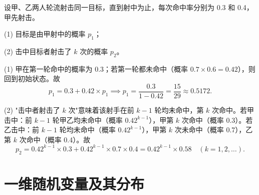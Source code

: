 \documentclass[lang=cn,11pt]{elegantbook}
\begin{document}
\begin{exercise}\label{exer:1-59}
设甲、乙两人轮流射击同一目标，直到射中为止，每次命中率分别为 0.3 和 0.4，甲先射击。\par
(1) 目标是由甲射中的概率 \(p_1\)；\par
(2) 击中目标者射击了 \(k\) 次的概率 \(p_2\)。
\end{exercise}

\begin{solution}
(1) 甲在第一轮命中的概率为 0.3；若第一轮都未命中（概率 \(0.7\times 0.6=0.42\)），则回到初始状态。故
\[
p_1 = 0.3 + 0.42\times p_1 \implies p_1 = \frac{0.3}{1-0.42} = \frac{15}{29} \approx 0.5172.
\]

(2) "击中者射击了 \(k\) 次"意味着该射手在前 \(k-1\) 轮均未命中，第 \(k\) 次命中。若甲击中：前 \(k-1\) 轮甲乙均未命中（概率 \(0.42^{k-1}\)），甲第 \(k\) 次命中（概率 0.3）。若乙击中：前 \(k-1\) 轮均未命中（概率 \(0.42^{k-1}\)），甲第 \(k\) 次未命中（概率 0.7），乙第 \(k\) 次命中（概率 0.4）。故
\[
p_2 = 0.42^{k-1}\times 0.3 + 0.42^{k-1}\times 0.7\times 0.4 = 0.42^{k-1}\times 0.58 \quad (k=1,2,\dots).
\]
\end{solution}

\chapter{一维随机变量及其分布}
\end{document}
